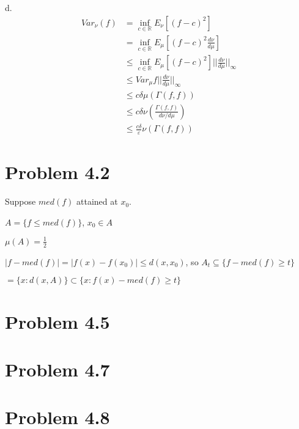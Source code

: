 \documentclass[11pt]{article}
\begin{document}
d.
\begin{align*}
Var_{\nu}(f) &= \inf_{c \in \mathbb R} E_{\nu}[(f - c)^2]
\\&= \inf_{c \in \mathbb R} E_{\mu}[(f - c)^2 \frac{d\nu}{d\mu}]
\\&\le \inf_{c \in \mathbb R} E_{\mu}[(f - c)^2] ||\frac{d\nu}{d\mu}||_{\infty}
\\&\le  Var_{\mu} f ||\frac{d\nu}{d\mu}||_{\infty}
\\&\le c \delta \mu(\Gamma(f, f)) 
\\&\le c \delta\nu(\frac{\Gamma(f, f)}{d\nu/d\mu}) 
\\&\le \frac{c\delta}{\varepsilon} \nu(\Gamma(f, f)) 
\end{align*}

\section{Problem 4.2}
\label{sec:orgheadline3}
Suppose \(med(f)\) attained at \(x_0\).

\(A = \{f \le med(f)\}\), \(x_0 \in A\)

\(\mu(A) = \frac12\)

\(|f - med(f)| = |f(x) - f(x_0)| \le d(x, x_0)\), so \(A_{t} \subseteq \{ f - med(f) \ge t\}\)

\(= \{ x: d(x, A)\} \subset \{ x: f(x) - med(f) \ge t\}\) 
\section{Problem 4.5}
\label{sec:orgheadline4}
\section{Problem 4.7}
\label{sec:orgheadline5}
\section{Problem 4.8}
\label{sec:orgheadline6}
\end{document}

